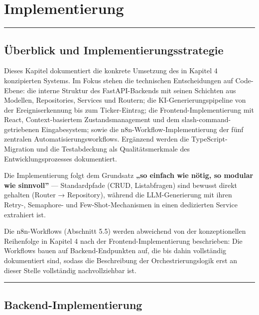 \chapter{Implementierung}\label{implementierung}

\begin{center}\rule{0.5\linewidth}{0.5pt}\end{center}

\section{Überblick und
Implementierungsstrategie}\label{uxfcberblick-und-implementierungsstrategie}

Dieses Kapitel dokumentiert die konkrete Umsetzung des in Kapitel 4
konzipierten Systems. Im Fokus stehen die technischen Entscheidungen auf
Code-Ebene: die interne Struktur des FastAPI-Backends mit seinen
Schichten aus Modellen, Repositories, Services und Routern; die
KI-Generierungspipeline von der Ereigniserkennung bis zum
Ticker-Eintrag; die Frontend-Implementierung mit React,
Context-basiertem Zustandsmanagement und dem slash-command-getriebenen
Eingabesystem; sowie die n8n-Workflow-Implementierung der fünf zentralen
Automatisierungsworkflows. Ergänzend werden die TypeScript-Migration und
die Testabdeckung als Qualitätsmerkmale des Entwicklungsprozesses
dokumentiert.

Die Implementierung folgt dem Grundsatz \textbf{„so einfach wie nötig,
so modular wie sinnvoll''} — Standardpfade (CRUD, Listabfragen) sind
bewusst direkt gehalten (Router → Repository), während die
LLM-Generierung mit ihren Retry-, Semaphore- und Few-Shot-Mechanismen in
einen dedizierten Service extrahiert ist.

Die n8n-Workflows (Abschnitt 5.5) werden abweichend von der
konzeptionellen Reihenfolge in Kapitel 4 nach der
Frontend-Implementierung beschrieben: Die Workflows bauen auf
Backend-Endpunkten auf, die bis dahin vollständig dokumentiert sind,
sodass die Beschreibung der Orchestrierungslogik erst an dieser Stelle
vollständig nachvollziehbar ist.

\begin{center}\rule{0.5\linewidth}{0.5pt}\end{center}

\section{Backend-Implementierung}\label{backend-implementierung}

